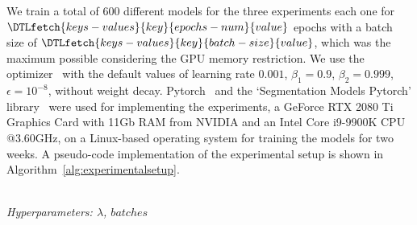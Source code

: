 \documentclass{elsarticle}
\begin{document}
We train a total of $600$ different models for the three experiments
each one for $\DTLfetch{keys-values}{key}{epochs-num}{value}$ epochs
with a batch size of
$\DTLfetch{keys-values}{key}{batch-size}{value}$, which was the
maximum possible considering the GPU memory restriction.
We use the optimizer~\cite{kingma2014adam} with the default values of
learning rate $0.001$, $\beta_1=0.9$, $\beta_2=0.999$,
$\epsilon=10^{-8}$, without weight decay.
Pytorch~\cite{paszke2019pytorch} and the `Segmentation Models
Pytorch' library~\cite{yakubovskiy2019segmentation} were used for
implementing the experiments, a GeForce RTX 2080 Ti Graphics Card
with 11Gb RAM from NVIDIA and an Intel Core i9-9900K CPU @3.60GHz, on
a Linux-based operating system for training the models for two weeks.
A pseudo-code implementation of the experimental setup is shown in
Algorithm~\ref{alg:experimentalsetup}.

\begin{algorithm}[H]
  \caption{Experimental setup}\label{alg:experimentalsetup}
  \begin{algorithmic}[1]
    \renewcommand{\algorithmicrequire}{\textbf{Input:}}
    \renewcommand{\algorithmicensure}{\textbf{Output:}}
    \\ \textit{Hyperparameters:  $\lambda$, $batches$}
    \ENDFOR{}
    \ENDFOR{}
    \ENDIF{}
    \ENDFOR{}
    \ENDFOR{}
    \ENDFOR{}
    \ENDFOR{}
    \ENDFOR{}
  \end{algorithmic}
\end{algorithm}
\end{document}
